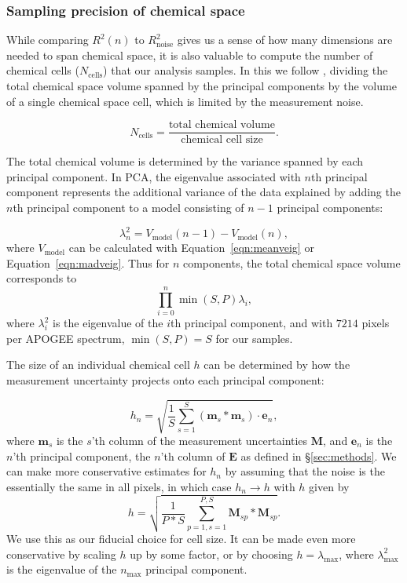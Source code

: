 \documentclass[a4paper,fleqn,usenatbib]{mnras}
\newcommand       \Rnoise   {{R^2_{\mathrm{noise}}}}
\begin{document}
\subsubsection{Sampling precision of chemical space}

While comparing $R^2(n)$  to $\Rnoise$ gives us a sense of how many dimensions are needed to span chemical space, it is also valuable to compute the number of chemical cells ($N_{\mathrm{cells}}$) that our analysis samples. In this we follow \citet{Ting2015a}, dividing the total chemical space volume spanned by the principal components by the volume of a single chemical space cell, which is limited by the measurement noise.

\begin{equation}
N_{\mathrm{cells}} = \frac{\mathrm{total\,\,chemical\,\,volume}}{\mathrm{chemical\,\,cell\,\,size}}.
\end{equation}

The total chemical volume is determined by the variance spanned by each principal component. In PCA, the eigenvalue  associated with $n$th principal component represents the additional variance of the data explained by adding the $n$th principal component to a model consisting of $n-1$ principal components:

\begin{equation}
\lambda_n^2 = V_{\mathrm{model}}(n-1) - V_{\mathrm{model}}(n),
\end{equation}
where $V_{\mathrm{model}}$ can be calculated with Equation~\eqref{eqn:meanveig} or Equation~\eqref{eqn:madveig}. Thus for $n$ components, the total chemical space volume corresponds to 
\begin{equation}
	\prod_{i=0}^{n} \min (S,P) \lambda_i,
\end{equation}
where $\lambda_i^2$ is the eigenvalue of the $i$th principal component, and with $7214$ pixels per APOGEE spectrum, $\min (S,P) = S$ for our samples.

The size of an individual chemical cell $h$ can be determined by how the measurement uncertainty projects onto each principal component:

\begin{equation}
h_n = \sqrt{\frac{1}{S}\sum_{s=1}^{S}\left(\mathbf{m}_{s}*\mathbf{m}_{s}\right)\cdot \mathbf{e}_n},
\end{equation}
where $\mathbf{m}_{s}$ is the $s$'th column of the measurement uncertainties $\mathbf{M}$, and $\mathbf{e}_n$ is the $n$'th principal component, the $n$'th column of $\mathbf{E}$ as defined in \S\ref{sec:methods}.
We can make more conservative estimates for $h_n$ by assuming that the noise is the essentially the same in all pixels, in which case $h_n \rightarrow h$ with $h$ given by
\begin{equation}
h = \sqrt{\frac{1}{P*S}\sum_{p=1,s=1}^{P,S} \mathbf{M}_{sp} * \mathbf{M}_{sp}}.
\label{eqn:consth}
\end{equation}
We use this as our fiducial choice for cell size. It can be made even more conservative by scaling $h$ up by some factor, or by choosing $h=\lambda_{\max}$, where $\lambda_{\max}^2$ is the eigenvalue of the $n_{\max}$ principal component.
\end{document}

